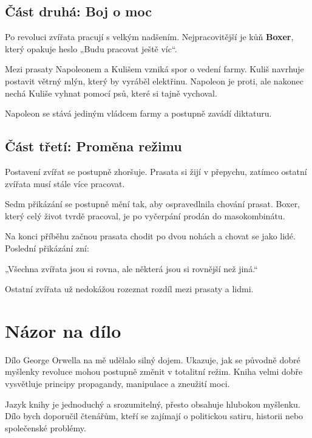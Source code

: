 \documentclass[12pt,a4paper]{article}
\begin{document}
\subsection*{Část druhá: Boj o moc}

Po revoluci zvířata pracují s velkým nadšením. Nejpracovitější je kůň \textbf{Boxer}, který opakuje heslo „Budu pracovat ještě víc“.  

Mezi prasaty Napoleonem a Kulišem vzniká spor o vedení farmy. Kuliš navrhuje postavit větrný mlýn, který by vyráběl elektřinu. Napoleon je proti, ale nakonec nechá Kuliše vyhnat pomocí psů, které si tajně vychoval.  

Napoleon se stává jediným vládcem farmy a postupně zavádí diktaturu.

\subsection*{Část třetí: Proměna režimu}

Postavení zvířat se postupně zhoršuje. Prasata si žijí v přepychu, zatímco ostatní zvířata musí stále více pracovat.  

Sedm přikázání se postupně mění tak, aby ospravedlnila chování prasat. Boxer, který celý život tvrdě pracoval, je po vyčerpání prodán do masokombinátu.  

Na konci příběhu začnou prasata chodit po dvou nohách a chovat se jako lidé. Poslední přikázání zní:  

„Všechna zvířata jsou si rovna, ale některá jsou si rovnější než jiná.“  

Ostatní zvířata už nedokážou rozeznat rozdíl mezi prasaty a lidmi.

\section*{Názor na dílo}

Dílo George Orwella na mě udělalo silný dojem. Ukazuje, jak se původně dobré myšlenky revoluce mohou postupně změnit v totalitní režim. Kniha velmi dobře vysvětluje principy propagandy, manipulace a zneužití moci.  

Jazyk knihy je jednoduchý a srozumitelný, přesto obsahuje hlubokou myšlenku. Dílo bych doporučil čtenářům, kteří se zajímají o politickou satiru, historii nebo společenské problémy.
\end{document}
